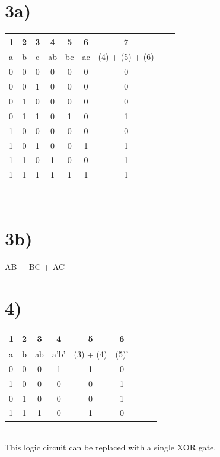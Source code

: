 \documentclass[a4paper,11pt]{article}
\begin{document}
\section*{3a)}
\begin{tabular}{| l | c | c | c | c | c | c | c | c |}
  \hline	
    1 & 2 & 3 & 4 & 5 & 6 & 7  \\  \hline \hline
    a & b & c & ab & bc & ac & (4) + (5) + (6)  \\  \hline \hline
    0 & 0 & 0 & 0 & 0 & 0 & 0  \\  \hline 
    0 & 0 & 1 & 0 & 0 & 0 & 0  \\  \hline 
    0 & 1 & 0 & 0 & 0 & 0 & 0  \\  \hline 
    0 & 1 & 1 & 0 & 1 & 0 & 1  \\  \hline 
    1 & 0 & 0 & 0 & 0 & 0 & 0  \\  \hline 
    1 & 0 & 1 & 0 & 0 & 1 & 1  \\  \hline 
    1 & 1 & 0 & 1 & 0 & 0 & 1  \\  \hline 
    1 & 1 & 1 & 1 & 1 & 1 & 1  \\  \hline 
\end{tabular} \\

\section*{3b)}
AB + BC + AC


\section*{4)}
\begin{tabular}{| l | c | c | c | c | c | c | c | c |}
  \hline	
    1 & 2 & 3 & 4 & 5 & 6  \\  \hline \hline
    a & b & ab & a'b'& (3) + (4) & (5)'  \\  \hline \hline
    0 & 0 & 0 & 1 & 1 & 0   \\  \hline 
    1 & 0 & 0 & 0 & 0 & 1   \\  \hline 
    0 & 1 & 0 & 0 & 0 & 1   \\  \hline 
    1 & 1 & 1 & 0 & 1 & 0   \\  \hline 
\end{tabular} \\

\noindent This logic circuit can be replaced with a single XOR gate.
\end{document}
